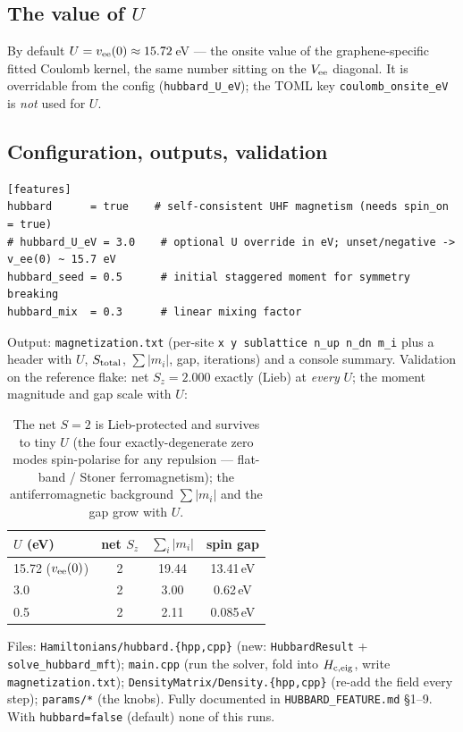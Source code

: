 \documentclass[11pt]{article}
\newcommand{\code}[1]{\texttt{\small #1}}
\begin{document}
\subsection{The value of $U$}
By default $U=v_{\rm ee}(0)\approx15.72$\,eV --- the onsite value of the
graphene-specific fitted Coulomb kernel, the same number sitting on the $V_{\rm ee}$
diagonal. It is overridable from the config (\code{hubbard\_U\_eV}); the TOML key
\code{coulomb\_onsite\_eV} is \emph{not} used for $U$.

\subsection{Configuration, outputs, validation}
\begin{lstlisting}
[features]
hubbard      = true    # self-consistent UHF magnetism (needs spin_on = true)
# hubbard_U_eV = 3.0    # optional U override in eV; unset/negative -> v_ee(0) ~ 15.7 eV
hubbard_seed = 0.5      # initial staggered moment for symmetry breaking
hubbard_mix  = 0.3      # linear mixing factor
\end{lstlisting}
Output: \code{magnetization.txt} (per-site \code{x y sublattice n\_up n\_dn m\_i}
plus a header with $U$, $S_{\rm total}$, $\sum|m_i|$, gap, iterations) and a
console summary. Validation on the reference flake: net $S_z=2.000$ exactly
(Lieb) at \emph{every} $U$; the moment magnitude and gap scale with $U$:
\begin{table}[h]
\centering
\begin{tabular}{lccc}
\toprule
$U$ (eV) & net $S_z$ & $\sum_i|m_i|$ & spin gap\\
\midrule
15.72 ($v_{\rm ee}(0)$) & 2 & 19.44 & 13.41\,eV\\
3.0  & 2 & 3.00 & 0.62\,eV\\
0.5  & 2 & 2.11 & 0.085\,eV\\
\bottomrule
\end{tabular}
\caption{The net $S=2$ is Lieb-protected and survives to tiny $U$ (the four
exactly-degenerate zero modes spin-polarise for any repulsion --- flat-band /
Stoner ferromagnetism); the antiferromagnetic background $\sum|m_i|$ and the gap
grow with $U$.}
\end{table}
Files: \code{Hamiltonians/hubbard.\{hpp,cpp\}} (new: \code{HubbardResult} +
\code{solve\_hubbard\_mft}); \code{main.cpp} (run the solver, fold into
$H_{\rm c,eig}$, write \code{magnetization.txt}); \code{DensityMatrix/Density.\{hpp,cpp\}}
(re-add the field every step); \code{params/*} (the knobs). Fully documented in
\code{HUBBARD\_FEATURE.md} \S1--9. With \code{hubbard=false} (default) none of
this runs.
\end{document}

